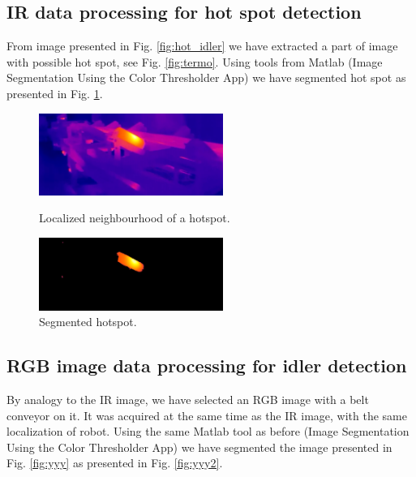 \documentclass[3p,times,12pt]{elsarticle}
\begin{document}
\subsection{IR data processing for hot spot detection}

From image presented in Fig. \ref{fig:hot_idler} we have extracted a part of image with possible hot spot, see Fig. \ref{fig:termo}.
Using tools from Matlab (Image Segmentation Using the Color Thresholder App) we have segmented hot spot as presented in Fig.  \ref{fig:termo2}.

\begin{figure}
\centering
\begin{minipage}[c]{0.48\textwidth}
\centering
\includegraphics[width=6cm]{termo.png}
\centering
\caption{Localized neighbourhood of a hotspot.}
\label{fig:termo}
\end{minipage}
\hfill
\begin{minipage}[c]{0.48\textwidth}
\centering
\includegraphics[width=6cm]{termo2.png}
\centering
\caption{Segmented hotspot.} \label{fig:termo2}
	
\end{minipage}
\end{figure}



\subsection{RGB image data processing for idler detection}

By analogy to the IR image, we have selected an RGB image with a belt conveyor on it. It was acquired at the same time as the IR image, with the same localization of robot. Using the same  Matlab tool as before (Image Segmentation Using the Color Thresholder App) we have segmented the image presented in Fig. \ref{fig:yyy} as presented in Fig. \ref{fig:yyy2}.
\end{document}

